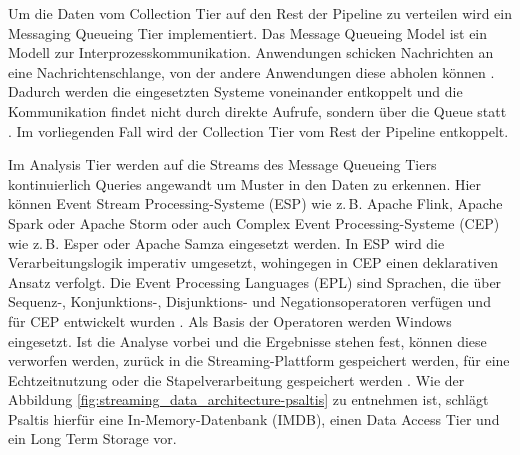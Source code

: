 Um die Daten vom Collection Tier auf den Rest der Pipeline zu verteilen wird ein Messaging Queueing Tier implementiert.
Das Message Queueing Model ist ein Modell zur Interprozesskommunikation. Anwendungen schicken
Nachrichten an eine Nachrichtenschlange, von der andere Anwendungen diese abholen können \cite{gray2003interprocess}.
Dadurch werden die eingesetzten Systeme voneinander entkoppelt und die Kommunikation findet nicht durch direkte Aufrufe,
sondern über die Queue statt \cite{psaltis2017streaming}. Im vorliegenden Fall wird der Collection Tier vom Rest der Pipeline entkoppelt.

Im Analysis Tier werden auf die Streams des Message Queueing Tiers kontinuierlich Queries angewandt um Muster in den Daten zu erkennen.
Hier können Event Stream Processing-Systeme (ESP) wie z.\,B. Apache Flink, Apache Spark oder Apache Storm oder
auch Complex Event Processing-Systeme (CEP) wie z.\,B. Esper oder Apache Samza eingesetzt werden. \cite{psaltis2017streaming}
In ESP wird die Verarbeitungslogik imperativ umgesetzt, wohingegen in CEP einen deklarativen Ansatz verfolgt.
Die Event Processing Languages (EPL) sind Sprachen, die über Sequenz-, Konjunktions-, Disjunktions- und Negationsoperatoren
verfügen und für CEP entwickelt wurden \cite{hedtstck2017complex}. Als Basis der Operatoren werden Windows eingesetzt.
Ist die Analyse vorbei und die Ergebnisse stehen fest, können diese verworfen werden, zurück in die Streaming-Plattform gespeichert werden,
für eine Echtzeitnutzung oder die Stapelverarbeitung gespeichert werden \cite{psaltis2017streaming}. Wie der Abbildung \ref{fig:streaming_data_architecture-psaltis}
zu entnehmen ist, schlägt Psaltis hierfür eine In-Memory-Datenbank (IMDB), einen Data Access Tier und ein Long Term Storage vor.

